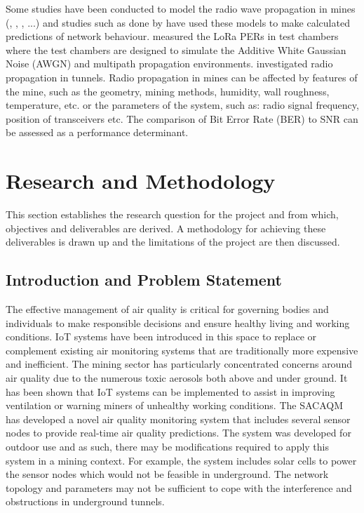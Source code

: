 \documentclass[a4paper,twoside,12pt]{report}
\begin{document}
Some studies have been conducted to model the radio wave propagation in mines (\citep{MineRadioPredictionModel1}, \citep{MineRadioPredictionModel2},  \citep{MineRadioPredictionModel3}, \citep{Hrovat2014ATunnels}...) and studies such as done by \cite{Emmanuel2019LoRaMines} have used these models to make calculated predictions of network behaviour. \cite{MineRadioPredictionModel3} measured the LoRa PERs in test chambers where the test chambers are designed to simulate the Additive White Gaussian Noise (AWGN) and multipath propagation environments. \cite{Hrovat2014ATunnels} investigated radio propagation in tunnels. Radio propagation in mines can be affected by features of the mine, such as the geometry, mining methods, humidity, wall roughness, temperature, etc. or the parameters of the system, such as: radio signal frequency, position of transceivers etc. The comparison of Bit Error Rate (BER) to SNR can be assessed as a performance determinant\citep{Emmanuel2019LoRaMines}.

\chapter{Research and Methodology}
This section establishes the research question for the project and from which, objectives and deliverables are derived. A methodology for achieving these deliverables is drawn up and the limitations of the project are then discussed.

\section{Introduction and Problem Statement}
The effective management of air quality is critical for governing bodies and individuals to make responsible decisions and ensure healthy living and working conditions. IoT systems have been introduced in this space to replace or complement existing air monitoring systems that are traditionally more expensive and inefficient. 
\newline \newline
The mining sector has particularly concentrated concerns around air quality due to the numerous toxic aerosols both above and under ground. It has been shown that IoT systems can be implemented to assist in improving ventilation or warning miners of unhealthy working conditions. 
\newline \newline
The SACAQM has developed a novel air quality monitoring system that includes several sensor nodes to provide real-time air quality predictions. The system was developed for outdoor use and as such, there may be modifications required to apply this system in a mining context. For example, the system includes solar cells to power the sensor nodes which would not be feasible in underground. The network topology and parameters may not be sufficient to cope with the interference and obstructions in underground tunnels.
\end{document}
